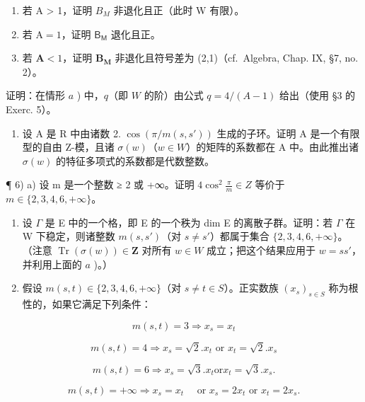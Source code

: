\begin{enumerate}
\def\labelenumi{\alph{enumi})}
\item
  若 A \textgreater{} 1，证明 \(B_{M}\) 非退化且正（此时 W 有限）。
\item
  若 \(\mathrm{A} = 1\)，证明 \(\mathsf{B}_{\mathsf{M}}\) 退化且正。
\item
  若 \(\mathbf{A} < 1\)，证明 \(\mathbf{B}_{\mathbf{M}}\) 非退化且符号差为 (2,1)（cf.~Algebra, Chap. IX, §7, no. 2）。
\end{enumerate}

证明：在情形 \(a\) ) 中，\(q\)（即 \(W\) 的阶）由公式 \(q = 4 / (A - 1)\) 给出（使用 §3 的 Exerc. 5）。

\begin{enumerate}
\def\labelenumi{\arabic{enumi})}
\setcounter{enumi}{4}
\tightlist
\item
  设 A 是 R 中由诸数 2. \(\cos(\pi/m(s, s'))\) 生成的子环。证明 A 是一个有限型的自由 Z-模，且诸 \(\sigma(w)\)（\(w \in W\)）的矩阵的系数都在 A 中。由此推出诸 \(\sigma(w)\) 的特征多项式的系数都是代数整数。
\end{enumerate}

¶ 6) a) 设 m 是一个整数 ≥ 2 或 +∞。证明 \(4 \cos^{2} \frac{\pi}{m} \in Z\) 等价于 \(m \in \{2, 3, 4, 6, +\infty\}\)。

\begin{enumerate}
\def\labelenumi{\alph{enumi})}
\setcounter{enumi}{1}
\item
  设 \(\Gamma\) 是 E 中的一个格，即 E 的一个秩为 dim E 的离散子群。证明：若 \(\Gamma\) 在 W 下稳定，则诸整数 \(m(s, s')\)（对 \(s \neq s'\)）都属于集合 \(\{2, 3, 4, 6, +\infty\}\)。（注意 \(\operatorname{Tr}(\sigma(w)) \in \mathbf{Z}\) 对所有 \(w \in W\) 成立；把这个结果应用于 \(w = ss'\)，并利用上面的 \(a\) )。）
\item
  假设 \(m(s, t) \in \{2, 3, 4, 6, +\infty\}\)（对 \(s \neq t \in S\)）。正实数族 \((x_s)_{s \in S}\) 称为根性的，如果它满足下列条件：
\end{enumerate}

\[
m (s, t) = 3 \Longrightarrow x _ {s} = x _ {t}
\]

\[
m (s, t) = 4 \Longrightarrow x _ {s} = \sqrt {2}. x _ {t} \text { or } x _ {t} = \sqrt {2}. x _ {s}
\]

\[
m (s, t) = 6 \Longrightarrow x _ {s} = \sqrt {3}. x _ {t} \text {or} x _ {t} = \sqrt {3}. x _ {s}.
\]

\[
m (s, t) = + \infty \Longrightarrow x _ {s} = x _ {t} \quad \text { or } x _ {s} = 2 x _ {t} \text { or } x _ {t} = 2 x _ {s}.
\]

